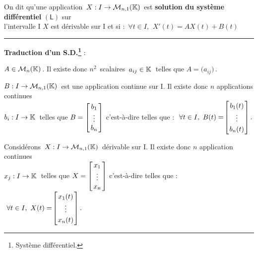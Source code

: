 \vspace{1cm}

On dit qu'une application \(\,X:I\to \mathcal{M}_{n,1}(\mathbb{K})\,\) est \textbf{solution du système différentiel} \((\mathsf{L})\) sur\vspace{0.1cm}\\
l'intervalle I \ssi $X$ est dérivable sur I et si : \(\, \forall t\in I,\ \, X'(t)=AX(t)+B(t)\)

\newpage

\hrule

\vspace{1cm}

\begin{center}
\textbf{Traduction d'un S.D.\footnote{Système différentiel.}} :\end{center} 
\vspace{0.7cm}

\noindent \(A\in \mathcal{M}_n(\mathbb{K})\,\). Il existe donc $n^2\,$ scalaires \(\,a_{ij}\in \mathbb{K} \: \) telles que \(A=\bigl(a_{ij}\bigr)\,\).\vspace{0.5cm}

\(B:I\to \mathcal{M}_{n,1}(\mathbb{K})\,\) est une application continue sur I. Il existe donc $n$ applications continues\\
\(b_i:I\to \mathbb{K} \: \) telles que \(B=\arraycolsep=0.05cm\def\arraystretch{1} \left[
\begin{array}{c}
    b_1\\
    \vdots\\
    b_n
\end{array}    
\right]\) c'est-à-dire telles que : \(\ \forall t \in I,\ B(t)=\!\arraycolsep=0.03cm\def\arraystretch{1.2}\left[
    \begin{array}{c}
        b_1(t)\\
        \vdots\\
        b_n(t)
    \end{array}    
    \right].\)

\vspace{0.5cm}

Considérons \(\,X:I\to\mathcal{M}_{n,1}(\mathbb{K})\,\) dérivable sur I. Il existe donc $n$ application continues\\
\(x_j:I\to \mathbb{K} \: \) telles que \(X=\arraycolsep=0.05cm\def\arraystretch{1} \left[
\begin{array}{c}
    x_1\\
    \vdots\\
    x_n
\end{array}    
\right]\) c'est-à-dire telles que : \(\ \forall t \in I,\ X(t)=\!\arraycolsep=0.03cm\def\arraystretch{1.2}\left[
    \begin{array}{c}
        x_1(t)\\
        \vdots\\
        x_n(t)
    \end{array}    
    \right].\)

